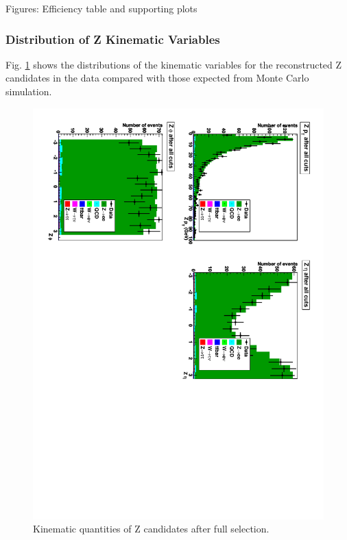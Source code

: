 Figures: Efficiency table and supporting plots

\subsubsection{Distribution of Z Kinematic Variables}

Fig. \ref{fig:Zquantities} shows the distributions of the kinematic variables for the reconstructed Z candidates 
in the data compared with those expected from Monte Carlo simulation.  

 \begin{figure}[htb]
  \begin{center}
    \includegraphics[width=360pt, angle=90]{Figures/Zquantities-21sep10.pdf}
  \end{center}
  \caption[Kinematic quantities of Z candidates after full selection]{Kinematic quantities of Z candidates after full selection.}
  \label{fig:Zquantities}
 \end{figure}



\clearpage
